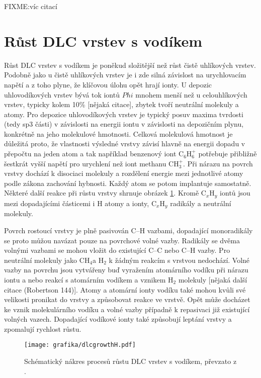 FIXME:víc citací

\section{Růst DLC vrstev s vodíkem}
Růst DLC vrstev s vodíkem je poněkud složitější než růst čistě uhlíkových vrstev. Podobně jako u čistě uhlíkových vrstev je i zde silná závislost na urychlovacím napětí a z toho plyne, že klíčovou úlohu opět hrají ionty. U depozic uhlovodíkových vrstev bývá tok iontů $Phi$ mnohem menší než u celouhlíkových vrstev, typicky kolem 10\% [nějaká citace], zbytek tvoří neutrální molekuly a atomy. Pro depozice uhlovodíkových vrstev je typický posuv maxima tvrdosti (tedy sp3 části) v závislosti na energii iontu v závislosti na depozičním plynu, konkrétně na jeho molekulové hmotnosti. 
Celková molekulová hmotnost je důležitá proto, že vlastnosti výsledné vrstvy závisí hlavně na energii dopadu v přepočtu na jeden atom a tak například benzenový iont C$_6$H$_6^+$ potřebuje přibližně šestkrát vyšší napětí pro urychlení než iont methanu CH$_3^+$. Při nárazu na povrch vrstvy dochází k disociaci molekuly a rozdělení energie mezi jednotlivé atomy podle zákona zachování hybnosti. Každý atom se potom implantuje samostatně. Některé další reakce při růstu vrstvy shrnuje obrázek \ref{dlcgrowthH}. Kromě C$_x$H$_y$ iontů jsou mezi dopadajícími částicemi i H atomy a ionty, C$_x$H$_y$ radikály a neutrální molekuly.

Povrch rostoucí vrstvy je plně pasivován C--H vazbami, dopadající monoradikály se proto můžou navázat pouze na povrchové volné vazby. Radikály se dvěma volnými vazbami se mohou vložit do existující C--C nebo C--H vazby. Pro neutrální molekuly jako CH$_4$a H$_2$ k žádným reakcím s vrstvou nedochází. Volné vazby na povrchu jsou vytvářeny buď vyražením atomárního vodíku při nárazu iontu a nebo reakcí s atomárním vodíkem a vznikem H$_2$ molekuly [nějaká další citace (Robertson 144)]. Atomy a atomární ionty vodíku také mohou kvůli své velikosti pronikat do vrstvy a způsobovat reakce ve vrstvě. Opět může docházet ke vznik molekulárního vodíku a volné vazby případně k repasivaci již existující volných vazech. Dopadající vodíkové ionty také způsobují leptání vrstvy a zpomalují rychlost růstu.

\begin{figure}[htbp]
  \centering
  \texttt{[image: grafika/dlcgrowthH.pdf]}
  \caption{Schématický nákres procesů růstu DLC vrstev s vodíkem, převzato z \cite{Robertson2002}.}
  \label{dlcgrowthH}
\end{figure}

